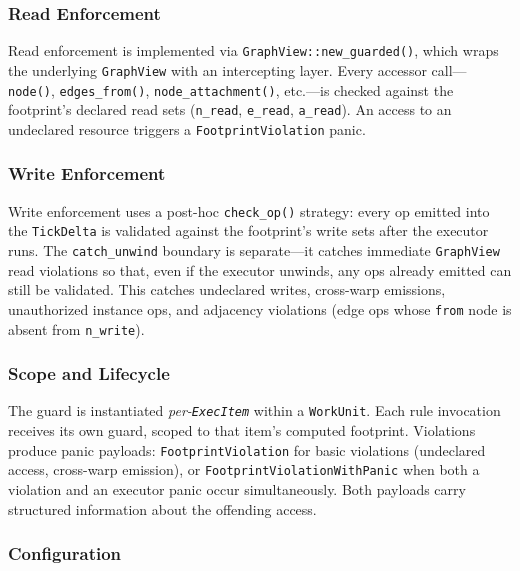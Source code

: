 \documentclass[
  11pt,
]{book}
\begin{document}
\subsubsection{Read Enforcement}\label{read-enforcement}

Read enforcement is implemented via \texttt{GraphView::new\_guarded()},
which wraps the underlying \texttt{GraphView} with an intercepting layer.
Every accessor call---\texttt{node()}, \texttt{edges\_from()},
\texttt{node\_attachment()}, etc.---is checked against the footprint's
declared read sets (\texttt{n\_read}, \texttt{e\_read}, \texttt{a\_read}).
An access to an undeclared resource triggers a \texttt{FootprintViolation}
panic.

\subsubsection{Write Enforcement}\label{write-enforcement}

Write enforcement uses a post-hoc \texttt{check\_op()} strategy: every op
emitted into the \texttt{TickDelta} is validated against the footprint's
write sets after the executor runs. The \texttt{catch\_unwind} boundary is
separate---it catches immediate \texttt{GraphView} read violations so that,
even if the executor unwinds, any ops already emitted can still be
validated. This catches undeclared writes, cross-warp emissions,
unauthorized instance ops, and adjacency violations (edge ops whose
\texttt{from} node is absent from \texttt{n\_write}).

\subsubsection{Scope and Lifecycle}\label{scope-and-lifecycle}

The guard is instantiated \emph{per-\texttt{ExecItem}} within a
\texttt{WorkUnit}. Each rule invocation receives its own guard, scoped to
that item's computed footprint. Violations produce panic payloads:
\texttt{FootprintViolation} for basic violations (undeclared access, cross-warp
emission), or \texttt{FootprintViolationWithPanic} when both a violation and
an executor panic occur simultaneously. Both payloads carry structured
information about the offending access.

\subsubsection{Configuration}\label{guard-configuration}
\end{document}
